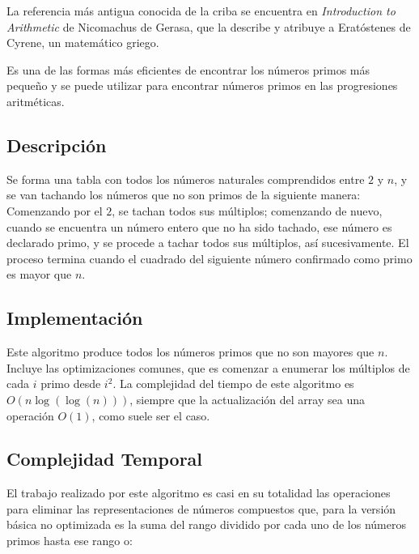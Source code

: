 \documentclass[12pt]{article}
\newcommand{\nl}{\vspace{0.3cm}}
\begin{document}
\nl

La referencia más antigua conocida de la criba se encuentra en \textit{Introduction to Arithmetic}\cite{ngpia} de Nicomachus de Gerasa, que la describe y atribuye a Eratóstenes de Cyrene, un matemático griego.

\nl

Es una de las formas más eficientes de encontrar los números primos más pequeño y se puede utilizar para encontrar números primos en las progresiones aritméticas.\cite{eseapa}

\subsection{Descripción}

\nl

Se forma una tabla con todos los números naturales comprendidos entre $2$ y $n$, y se van tachando los números que no son primos de la siguiente manera: Comenzando por el $2$, se tachan todos sus múltiplos; comenzando de nuevo, cuando se encuentra un número entero que no ha sido tachado, ese número es declarado primo, y se procede a tachar todos sus múltiplos, así sucesivamente. El proceso termina cuando el cuadrado del siguiente número confirmado como primo es mayor que $n$.

\subsection{Implementación}



\nl

Este algoritmo produce todos los números primos que no son mayores que $n$. Incluye las optimizaciones comunes, que es comenzar a enumerar los múltiplos de cada $i$ primo desde $i^2$. La complejidad del tiempo de este algoritmo es $O(n \log(\log(n)))$\cite{aipns}, siempre que la actualización del array sea una operación $O(1)$, como suele ser el caso.

\nl

\subsection{Complejidad Temporal}

\nl

El trabajo realizado por este algoritmo es casi en su totalidad las operaciones para eliminar las representaciones de números compuestos que, para la versión básica no optimizada es la suma del rango dividido por cada uno de los números primos hasta ese rango o:
\end{document}
